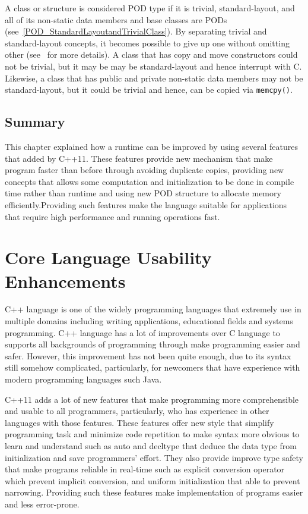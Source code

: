 \documentclass[11pt]{report}
\begin{document}
A class or structure is considered POD type if it is trivial, standard-layout, and all of its non-static data members and base classes are PODs (see~\ref{POD_StandardLayoutandTrivialClass}). By separating trivial and standard-layout concepts, it becomes possible to give up one without omitting other (see~\cite{Stroustrup:2012:Cpp11} for more details). A class that has copy  and move constructors could not be trivial, but it may be may be standard-layout and hence interrupt with C. Likewise, a class that has  public and private non-static data members may not be standard-layout, but it could be trivial and hence, can be copied via \texttt{memcpy()}.

\section{Summary}
\label{sec: Summary}
This chapter explained how a runtime can be improved by using several features that added by C++11.  These features provide new mechanism that make program faster than before through avoiding duplicate copies, providing new concepts that allows some computation and initialization to be done in compile time rather than runtime and using new POD structure to allocate memory efficiently.Providing such features make the language suitable for applications that require high performance and running operations fast.

\chapter{Core Language Usability Enhancements}
\label{chapter: Usability Enhancements}
C++ language is one of the widely programming languages that extremely use in multiple domains including writing applications, educational fields and systems programming. C++ language has a lot of improvements over C language to supports all backgrounds of programming through make programming easier and safer. However, this improvement has not been quite enough, due to its syntax still somehow complicated, particularly, for newcomers that have experience with modern programming languages such Java.

C++11 adds a lot of new features that make programming more comprehensible and usable to all programmers, particularly, who has experience in other languages with those features. These features offer new style that simplify programming task and minimize code repetition to make syntax more obvious to learn and understand  such as auto and decltype that deduce the data type from initialization and save programmers' effort. They also provide improve type safety that make programs reliable in real-time such as explicit conversion operator which prevent implicit conversion, and uniform initialization that able to prevent narrowing. Providing such these features make implementation of programs easier and less error-prone.
\end{document}

